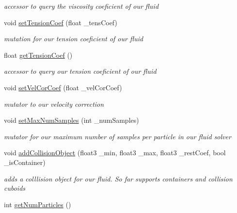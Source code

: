\begin{DoxyCompactItemize}
\begin{DoxyCompactList}\small\item\em accessor to query the viscosity coeficient of our fluid \end{DoxyCompactList}\item 
\hypertarget{class_s_p_h_engine_ac1e6f83f2da1ec79a6e6a633b810daba}{void \hyperlink{class_s_p_h_engine_ac1e6f83f2da1ec79a6e6a633b810daba}{set\-Tension\-Coef} (float \-\_\-tens\-Coef)}\label{class_s_p_h_engine_ac1e6f83f2da1ec79a6e6a633b810daba}

\begin{DoxyCompactList}\small\item\em mutation for our tension coeficient of our fluid \end{DoxyCompactList}\item 
\hypertarget{class_s_p_h_engine_afa874402b050ea1f618bf2caf7f988b4}{float \hyperlink{class_s_p_h_engine_afa874402b050ea1f618bf2caf7f988b4}{get\-Tension\-Coef} ()}\label{class_s_p_h_engine_afa874402b050ea1f618bf2caf7f988b4}

\begin{DoxyCompactList}\small\item\em accessor to query our tension coeficient of our fluid \end{DoxyCompactList}\item 
\hypertarget{class_s_p_h_engine_a6b418198ceab591b1abfa5f645dbc9d7}{void \hyperlink{class_s_p_h_engine_a6b418198ceab591b1abfa5f645dbc9d7}{set\-Vel\-Cor\-Coef} (float \-\_\-vel\-Cor\-Coef)}\label{class_s_p_h_engine_a6b418198ceab591b1abfa5f645dbc9d7}

\begin{DoxyCompactList}\small\item\em mutator to our velocity correction \end{DoxyCompactList}\item 
void \hyperlink{class_s_p_h_engine_aad9d9bc9a1a7e5f64a5e045c339f8b3e}{set\-Max\-Num\-Samples} (int \-\_\-num\-Samples)
\begin{DoxyCompactList}\small\item\em mutator for our maximum number of samples per particle in our fluid solver \end{DoxyCompactList}\item 
void \hyperlink{class_s_p_h_engine_afe2b02e535cf064f91f2de4312c8ae39}{add\-Collision\-Object} (float3 \-\_\-min, float3 \-\_\-max, float3 \-\_\-rest\-Coef, bool \-\_\-is\-Container)
\begin{DoxyCompactList}\small\item\em adds a colllision object for our fluid. So far supports containers and collision cuboids \end{DoxyCompactList}\item 
\hypertarget{class_s_p_h_engine_a387ab48532ca20b2eb31319e862e243b}{int \hyperlink{class_s_p_h_engine_a387ab48532ca20b2eb31319e862e243b}{get\-Num\-Particles} ()}\label{class_s_p_h_engine_a387ab48532ca20b2eb31319e862e243b}


\end{DoxyCompactItemize}
